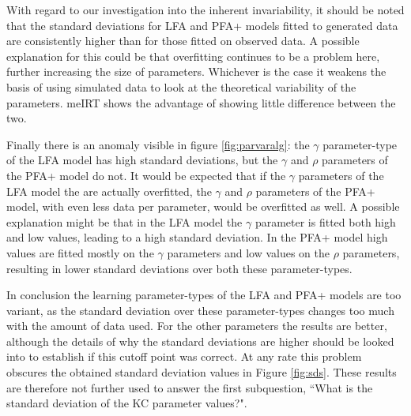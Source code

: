 \documentclass{scrartcl}
\begin{document}
With regard to our investigation into the inherent invariability, it should be noted that the standard deviations for LFA and PFA+ models fitted to generated data are consistently higher than for those fitted on observed data. A possible explanation for this could be that overfitting continues to be a problem here, further increasing the size of parameters. Whichever is the case it weakens the basis of using simulated data to look at the theoretical variability of the parameters. meIRT shows the advantage of showing little difference between the two.

Finally there is an anomaly visible in figure \ref{fig:parvaralg}: the $\gamma$ parameter-type of the LFA model has high standard deviations, but the $\gamma$ and $\rho$ parameters of the PFA+ model do not. It would be expected that if the $\gamma$ parameters of the LFA model the are actually overfitted, the $\gamma$ and $\rho$ parameters of the PFA+ model, with even less data per parameter, would be overfitted as well. A possible explanation might be that in the LFA model the $\gamma$ parameter is fitted both high and low values, leading to a high standard deviation. In the PFA+ model high values are fitted mostly on the $\gamma$ parameters and low values on the $\rho$ parameters, resulting in lower standard deviations over both these parameter-types.

In conclusion the learning parameter-types of the LFA and PFA+ models are too variant, as the standard deviation over these parameter-types changes too much with the amount of data used. For the other parameters the results are better, although the details of why the standard deviations are higher should be looked into to establish if this cutoff point was correct. At any rate this problem obscures the obtained standard deviation values in Figure \ref{fig:sds}. These results are therefore not further used to answer the first subquestion, ``What is the standard deviation of the KC parameter values?".
\end{document}
